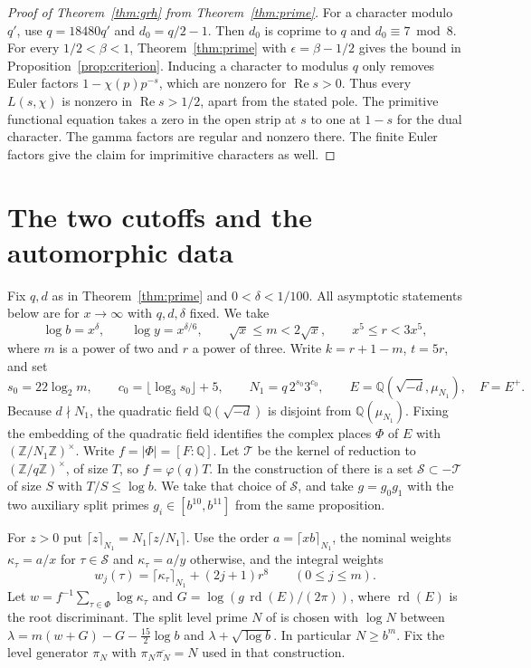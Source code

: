 \documentclass[11pt,reqno]{amsart}
\theoremstyle{definition}
\numberwithin{equation}{section}
\newcommand{\QQ}{\mathbb Q}
\newcommand{\ZZ}{\mathbb Z}
\newcommand{\re}{\operatorname{Re}}
\newcommand{\rd}{\operatorname{rd}}
\begin{document}
\begin{proof}[Proof of Theorem~\ref{thm:grh} from Theorem~\ref{thm:prime}]
For a character modulo \(q'\), use \(q=18480q'\) and \(d_0=q/2-1\).
Then \(d_0\) is coprime to \(q\) and \(d_0\equiv7\bmod 8\).
For every \(1/2<\beta<1\), Theorem~\ref{thm:prime} with
\(\epsilon=\beta-1/2\) gives the bound in
Proposition~\ref{prop:criterion}.
Inducing a character to modulus \(q\) only removes Euler factors
\(1-\chi(p)p^{-s}\), which are nonzero for \(\re s>0\).
Thus every \(L(s,\chi)\) is nonzero in \(\re s>1/2\), apart from
the stated pole. The primitive functional equation takes a zero in
the open strip at \(s\) to one at \(1-s\) for the dual character.
The gamma factors are regular and nonzero there. The finite Euler
factors give the claim for imprimitive characters as well.
\end{proof}




\section{The two cutoffs and the automorphic data}\label{sec:data}

Fix \(q,d\) as in Theorem~\ref{thm:prime} and \(0<\delta<1/100\).
All asymptotic statements below are for \(x\to\infty\) with \(q,d,\delta\)
fixed. We take
\[
 \log b=x^\delta,\qquad \log y=x^{\delta/6},\qquad
 \sqrt{x}\le m<2\sqrt{x},\qquad x^5\le r<3x^5,
\]
where \(m\) is a power of two and \(r\) a power of three. Write
\(k=r+1-m\), \(t=5r\), and set
\[
 s_0=22\log_2 m,\qquad c_0=\lfloor\log_3 s_0\rfloor+5,\qquad
 N_1=q\,2^{s_0}3^{c_0},\qquad
 E=\QQ(\sqrt{-d},\mu_{N_1}),\quad F=E^+.
\]
Because \(d\nmid N_1\), the quadratic field \(\QQ(\sqrt{-d})\) is
disjoint from \(\QQ(\mu_{N_1})\). Fixing the embedding of the quadratic
field identifies the complex places \(\Phi\) of \(E\) with
\((\ZZ/N_1\ZZ)^\times\). Write \(f=|\Phi|=[F:\QQ]\).
Let \(\mathcal T\) be the kernel of reduction to
\((\ZZ/q\ZZ)^\times\), of size \(T\), so \(f=\varphi(q)T\).
In the construction of \cite[Proposition~3.4]{chojecki} there is a set
\(\mathcal S\subset-\mathcal T\) of size \(S\) with \(T/S\le\log b\).
We take that choice of \(\mathcal S\), and take \(g=g_0g_1\) with
the two auxiliary split primes \(g_i\in[b^{10},b^{11}]\) from the
same proposition.

For \(z>0\) put \(\lceil z\rceil_{N_1}=N_1\lceil z/N_1\rceil\).
Use the order \(a=\lceil xb\rceil_{N_1}\), the nominal weights
\(\kappa_\tau=a/x\) for \(\tau\in\mathcal S\) and
\(\kappa_\tau=a/y\) otherwise, and the integral weights
\[
 w_j(\tau)=\lceil\kappa_\tau\rceil_{N_1}+(2j+1)r^8
 \qquad (0\le j\le m).
\]
Let \(w=f^{-1}\sum_{\tau\in\Phi}\log\kappa_\tau\) and
\(G=\log(g\,\rd(E)/(2\pi))\), where \(\rd(E)\) is the root
discriminant. The split level prime \(N\) of
\cite[Lemma~3.5]{chojecki} is chosen with \(\log N\) between
\(\lambda=m(w+G)-G-\tfrac{15}{2}\log b\) and
\(\lambda+\sqrt{\log b}\). In particular \(N\ge b^m\).
Fix the level generator \(\pi_N\) with \(\pi_N\overline{\pi_N}=N\)
used in that construction.
\end{document}
